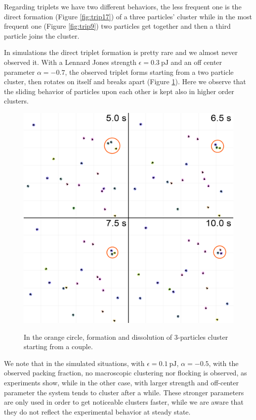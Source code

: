 \documentclass[../../master_thesis_np.tex]{subfiles}
\begin{document}
	Regarding triplets we have two different behaviors, the less frequent one is the direct formation (Figure \ref{fig:trip17}) of a three particles' cluster while in the most frequent one (Figure \ref{fig:trip9}) two particles get together and then a third particle joins the cluster.
	
	In simulations the direct triplet formation is pretty rare and we almost never observed it.
	With a Lennard Jones strength $\epsilon = \SI{0.3}{\pico\joule}$ and an off center parameter $\alpha = -0.7$, the observed triplet forms starting from a two particle cluster, then rotates on itself and breaks apart (Figure \ref{fig:simtrip}).
	Here we observe that the sliding behavior of particles upon each other is kept also in higher order clusters.
	
	\begin{figure}[hbtp]
		\centering
		\includegraphics[width = \textwidth]{qual/simtrip.png}
		\label{fig:simtrip}
		\caption{In the orange circle, formation and dissolution of 3-particles cluster starting from a couple.}
	\end{figure}

	We note that in the simulated situations, with $\epsilon = \SI{0.1}{\pico\joule}$, $\alpha = -0.5$, with the observed packing fraction, no macroscopic clustering nor flocking is observed, as experiments show, while in the other case, with larger strength and off-center parameter the system tends to cluster after a while.
	These stronger parameters are only used in order to get noticeable clusters faster, while we are aware that they do not reflect the experimental behavior at steady state.
	
\end{document}
